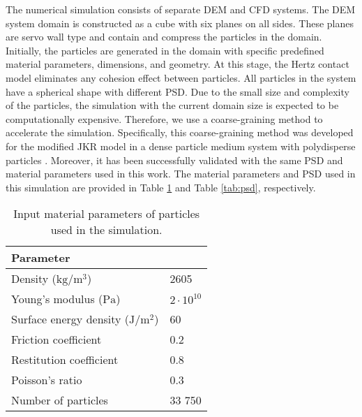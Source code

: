 \documentclass{article}
\begin{document}
The numerical simulation consists of separate DEM and CFD systems. The DEM system domain is constructed as a cube with six planes on all sides. These planes are servo wall type and contain and compress the particles in the domain. Initially, the particles are generated in the domain with specific predefined material parameters, dimensions, and geometry. At this stage, the Hertz contact model \citep{hertz1882ueber} eliminates any cohesion effect between particles. All particles in the system have a spherical shape with different PSD. Due to the small size and complexity of the particles, the simulation with the current domain size is expected to be computationally expensive. Therefore, we use a coarse-graining method to accelerate the simulation. Specifically, this coarse-graining method was developed for the modified JKR model in a dense particle medium system with polydisperse particles \citep{kazidenov2023coarse}. Moreover, it has been successfully validated with the same PSD and material parameters used in this work. The material parameters and PSD used in this simulation are provided in Table \ref{tab:mat_prameters} and Table \ref{tab:psd}, respectively. 

\begin{table}[H]
\fontsize{10}{12}\selectfont \caption{Input material parameters of particles used in the simulation.}
\begin{centering}
    \begin{tabular}{ p{5cm} p{2cm}}
\toprule 
Parameter \\
\midrule
 Density ($\mathrm {kg/m^{3}}$)      & 2605 \\
 Young's modulus ($\mathrm {Pa}$)   & $2\cdot10^{10}$   \\
 Surface energy density ($\mathrm {J/m^{2}} $)  & 60  \\
 Friction coefficient  & 0.2   \\
 Restitution coefficient  & 0.8   \\
 Poisson's ratio   & 0.3   \\
 Number of particles  & 33 750    \\
\bottomrule
\end{tabular}
  \label{tab:mat_prameters}
\par\end{centering}
\end{table}
\end{document}
